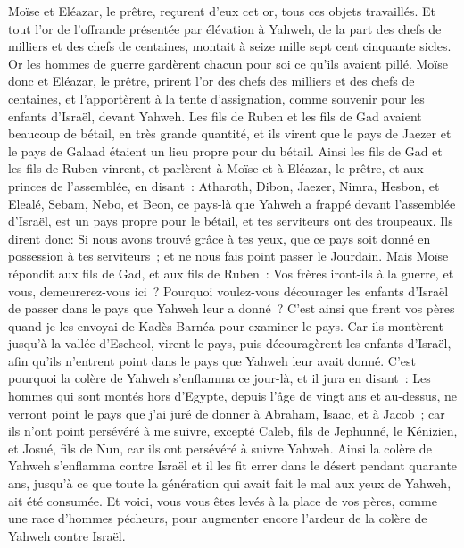 \begin{multicols}{2}
Moïse et Eléazar, le prêtre, reçurent d'eux cet or, tous ces objets travaillés.
Et tout l'or de l'offrande présentée par élévation à Yahweh, de la part des chefs de milliers et des chefs de centaines, montait à seize mille sept cent cinquante sicles.
Or les hommes de guerre gardèrent chacun pour soi ce qu'ils avaient pillé.
Moïse donc et Eléazar, le prêtre, prirent l'or des chefs des milliers et des chefs de centaines, et l'apportèrent à la tente d'assignation, comme souvenir pour les enfants d'Israël, devant Yahweh.
\VerseOne{}Les fils de Ruben et les fils de Gad avaient beaucoup de bétail, en très grande quantité, et ils virent que le pays de Jaezer et le pays de Galaad étaient un lieu propre pour du bétail.
Ainsi les fils de Gad et les fils de Ruben vinrent, et parlèrent à Moïse et à Eléazar, le prêtre, et aux princes de l'assemblée, en disant~:
Atharoth, Dibon, Jaezer, Nimra, Hesbon, et Elealé, Sebam, Nebo, et Beon,
ce pays-là que Yahweh a frappé devant l'assemblée d'Israël, est un pays propre pour le bétail, et tes serviteurs ont des troupeaux.
Ils dirent donc: Si nous avons trouvé grâce à tes yeux, que ce pays soit donné en possession à tes serviteurs~; et ne nous fais point passer le Jourdain.
Mais Moïse répondit aux fils de Gad, et aux fils de Ruben~: Vos frères iront-ils à la guerre, et vous, demeurerez-vous ici~?
Pourquoi voulez-vous décourager les enfants d'Israël de passer dans le pays que Yahweh leur a donné~?
C'est ainsi que firent vos pères quand je les envoyai de Kadès-Barnéa pour examiner le pays.
Car ils montèrent jusqu'à la vallée d'Eschcol, virent le pays, puis découragèrent les enfants d'Israël, afin qu'ils n'entrent point dans le pays que Yahweh leur avait donné.
C'est pourquoi la colère de Yahweh s'enflamma ce jour-là, et il jura en disant~:
Les hommes qui sont montés hors d'Egypte, depuis l'âge de vingt ans et au-dessus, ne verront point le pays que j'ai juré de donner à Abraham, Isaac, et à Jacob~; car ils n'ont point persévéré à me suivre,
excepté Caleb, fils de Jephunné, le Kénizien, et Josué, fils de Nun, car ils ont persévéré à suivre Yahweh.
Ainsi la colère de Yahweh s'enflamma contre Israël et il les fit errer dans le désert pendant quarante ans, jusqu'à ce que toute la génération qui avait fait le mal aux yeux de Yahweh, ait été consumée.
Et voici, vous vous êtes levés à la place de vos pères, comme une race d'hommes pécheurs, pour augmenter encore l'ardeur de la colère de Yahweh contre Israël.

\end{multicols}
